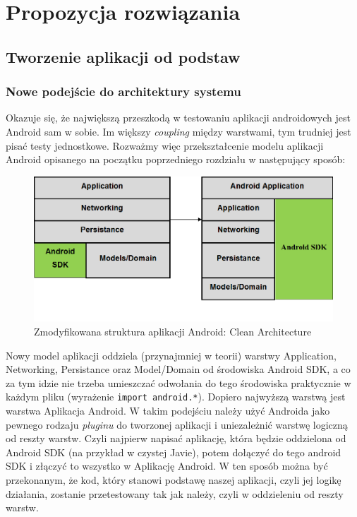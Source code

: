 \chapter{Propozycja rozwiązania}

\section{Tworzenie aplikacji od podstaw}
\label{nowa_aplikacja}
\subsection{Nowe podejście do architektury systemu}
\label{clean_architecture}
Okazuje się, że największą przeszkodą w testowaniu aplikacji androidowych jest Android sam w sobie. Im większy \textit{coupling} między warstwami, tym trudniej jest pisać testy jednostkowe. Rozważmy więc przekształcenie modelu aplikacji Android opisanego na początku poprzedniego rozdziału w następujący sposób:

\begin{figure}[!htb]
    \centering
    \includegraphics[width=13cm]{imgs/ch4_opis_rozwiazania_1.png}
    \caption
{Zmodyfikowana struktura aplikacji Android: Clean Architecture}
    \label{fig:opis_rozwiazania}
\end{figure} 

Nowy model aplikacji oddziela (przynajmniej w teorii) warstwy Application, Networking, Persistance oraz Model/Domain od środowiska Android SDK, a co za tym idzie nie trzeba umieszczać odwołania do tego środowiska praktycznie w każdym pliku (wyrażenie \texttt{import android.*}). Dopiero najwyższą warstwą jest warstwa Aplikacja Android. W takim podejściu należy użyć Androida jako pewnego rodzaju \textit{pluginu} do tworzonej aplikacji i uniezależnić warstwę logiczną od reszty warstw. Czyli najpierw napisać aplikację, która będzie oddzielona od Android SDK (na przykład w czystej Javie), potem dołączyć do tego android SDK i złączyć to wszystko w Aplikację Android. W ten sposób można być przekonanym, że kod, który stanowi podstawę naszej aplikacji, czyli jej logikę działania, zostanie przetestowany tak jak należy, czyli w oddzieleniu od reszty warstw.

